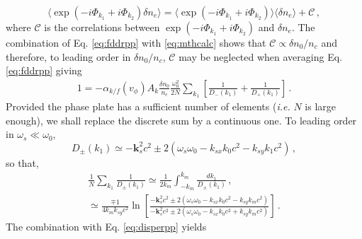 \documentclass[
 reprint,
 amsmath,amssymb,
 aps,
]{revtex4-1}
\begin{document}
\begin{equation}
\langle\exp(-i\Phi_{k_1}+i\Phi_{k_2})\delta n_e \rangle= \langle\exp(-i\Phi_{k_1}+i\Phi_{k_2}) \rangle\langle\delta n_e \rangle + \mathcal{C}\, , \label{eq:mthcalc}
\end{equation}
where $\mathcal{C}$ is the correlations   between  \mbox{$\exp(-i\Phi_{k_1}+i\Phi_{k_2})$} and $\delta n_e$. The combination of Eq. \eqref{eq:fddrpp} with \eqref{eq:mthcalc} shows that $\mathcal{C}\propto \delta n_0/n_c$ and therefore, to leading order in $\delta n_0/n_c$, $\mathcal{C}$ may  be neglected when  averaging   Eq. \eqref{eq:fddrpp} giving
\begin{align}
  1= -\alpha_{k/f}(v_\phi)A_k \frac{\delta n_0}{n_c} \frac{\omega_0^2}{2N}\sum_{ k_{1} }        \left[ \frac{1 }{D_-(k_{1})} +\frac{1}{D_+(k_{1})} \right] \, .\label{eq:disperpp} 
\end{align}
Provided the phase plate has a sufficient number of elements (\emph{i.e.} $N$ is large enough), we shall replace the discrete sum by a continuous one. To leading order 
in  $\omega_s\ll\omega_0$, 
\begin{equation}\label{eq:dpmk1}
D_\pm(k_1) \simeq -\mathbf{k}_s^2c^2\pm 2(\omega_s\omega_0 - k_{sx}k_0 c^2-k_{sy} k_1 c^2) \, , 
\end{equation} 
so that,
\begin{align}
 \frac{1}{N} \sum_{ k_{1} }  \frac{1 }{D_\pm(k_{1})}  \simeq \frac{1}{2k_m} \int_{ -k_m }^{ k_m }       \frac{dk_1 }{D_\pm(k_{1})}  \, , \nonumber\\
 \simeq \frac{\mp1}{4k_mk_{sy}c^2} \ln\left[
 \frac{ -\mathbf{k}_s^2c^2\pm 2(\omega_s\omega_0 - k_{sx}k_0 c^2-k_{sy} k_m c^2)}{ -\mathbf{k}_s^2c^2\pm 2(\omega_s\omega_0 - k_{sx}k_0 c^2+k_{sy} k_m c^2)} \right] \, .\label{eq:sumint} 
\end{align}
The combination with Eq. \eqref{eq:disperpp} yields
\end{document}
